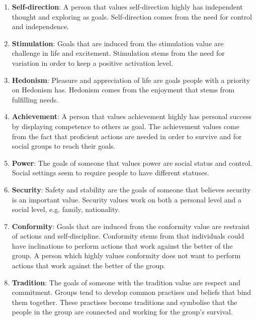 \begin{enumerate}
    \item \textbf{Self-direction}: A person that values self-direction highly has independent thought and exploring as goals. Self-direction comes from the need for control and independence.
    
    \item \textbf{Stimulation}: Goals that are induced from the stimulation value are challenge in life and excitement. Stimulation stems from the need for variation in order to keep a positive activation level.
    
    \item \textbf{Hedonism}: Pleasure and appreciation of life are goals people with a priority on Hedonism has. Hedonism comes from the enjoyment that stems from fulfilling needs. 
    
    \item \textbf{Achievement}: A person that values achievement highly has personal success by displaying competence to others as goal. The achievement values come from the fact that proficient actions are needed in order to survive and for social groups to reach their goals.
    
    \item \textbf{Power}: The goals of someone that values power are social status and control. Social settings seem to require people to have different statuses.
     
    \item \textbf{Security}: Safety and stability are the goals of someone that believes security is an important value. Security values work on both a personal level and a social level, e.g. family, nationality.
    
    \item \textbf{Conformity}: Goals that are induced from the conformity value are restraint of actions and self-discipline. Conformity stems from that individuals could have inclinations to perform actions that work against the better of the group. A person which highly values conformity does not want to perform actions that work against the better of the group.
    
    \item \textbf{Tradition}: The goals of someone with the tradition value are respect and commitment. Groups tend to develop common practises and beliefs that bind them together. These practises become traditions and symbolise that the people in the group are connected and working for the group's survival. 
    

\end{enumerate}
